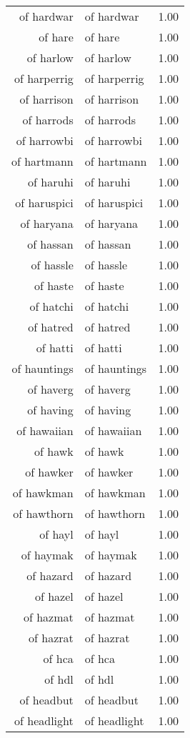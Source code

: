 \begin{table}[ht]
\begin{tabular}{rlr}
  of hardwar & of hardwar & 1.00 \\ 
  of hare & of hare & 1.00 \\ 
  of harlow & of harlow & 1.00 \\ 
  of harperrig & of harperrig & 1.00 \\ 
  of harrison & of harrison & 1.00 \\ 
  of harrods & of harrods & 1.00 \\ 
  of harrowbi & of harrowbi & 1.00 \\ 
  of hartmann & of hartmann & 1.00 \\ 
  of haruhi & of haruhi & 1.00 \\ 
  of haruspici & of haruspici & 1.00 \\ 
  of haryana & of haryana & 1.00 \\ 
  of hassan & of hassan & 1.00 \\ 
  of hassle & of hassle & 1.00 \\ 
  of haste & of haste & 1.00 \\ 
  of hatchi & of hatchi & 1.00 \\ 
  of hatred & of hatred & 1.00 \\ 
  of hatti & of hatti & 1.00 \\ 
  of hauntings & of hauntings & 1.00 \\ 
  of haverg & of haverg & 1.00 \\ 
  of having & of having & 1.00 \\ 
  of hawaiian & of hawaiian & 1.00 \\ 
  of hawk & of hawk & 1.00 \\ 
  of hawker & of hawker & 1.00 \\ 
  of hawkman & of hawkman & 1.00 \\ 
  of hawthorn & of hawthorn & 1.00 \\ 
  of hayl & of hayl & 1.00 \\ 
  of haymak & of haymak & 1.00 \\ 
  of hazard & of hazard & 1.00 \\ 
  of hazel & of hazel & 1.00 \\ 
  of hazmat & of hazmat & 1.00 \\ 
  of hazrat & of hazrat & 1.00 \\ 
  of hca & of hca & 1.00 \\ 
  of hdl & of hdl & 1.00 \\ 
  of headbut & of headbut & 1.00 \\ 
  of headlight & of headlight & 1.00 \\ 

\end{tabular}
\end{table}

